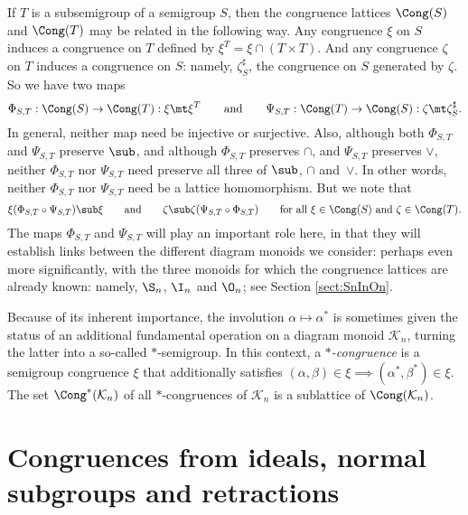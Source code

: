 If $T$ is a subsemigroup of a semigroup $S$, then the congruence lattices $\Cong(S)$ and $\Cong(T)$ may be related in the following way.  Any congruence $\xi$ on $S$ induces a congruence on $T$ defined by $\xi^T=\xi\cap(T\times T)$.  And any congruence $\zeta$ on $T$ induces a congruence on $S$: namely, $\zeta_S^\sharp$, the congruence on $S$ generated by $\zeta$.  So we have two maps
\[
\Phi_{S,T}:\Cong(S)\to\Cong(T):\xi\mt\xi^T \qquad\text{and}\qquad \Psi_{S,T}:\Cong(T)\to\Cong(S):\zeta\mt\zeta_S^\sharp.
\]
In general, neither map need be injective or surjective.  Also, although both $\Phi_{S,T}$ and $\Psi_{S,T}$ preserve $\sub$, and although $\Phi_{S,T}$ preserves $\cap$, and $\Psi_{S,T}$ preserves $\vee$, neither $\Phi_{S,T}$ nor $\Psi_{S,T}$ need preserve all three of $\sub$, $\cap$ and~$\vee$.  In other words, neither $\Phi_{S,T}$ nor $\Psi_{S,T}$ need be a lattice homomorphism.  But we note that
\[
\xi(\Phi_{S,T}\circ\Psi_{S,T}) \sub \xi \qquad\text{and}\qquad \zeta\sub\zeta(\Psi_{S,T}\circ\Phi_{S,T}) \qquad\text{for all $\xi\in\Cong(S)$ and $\zeta\in\Cong(T)$.}
\]
The maps $\Phi_{S,T}$ and $\Psi_{S,T}$ will play an important role here,
in that they will establish links between the different diagram monoids we consider:
perhaps even more significantly, with the three monoids for which the
congruence lattices are already known: namely, $\S_n$, $\I_n$ and $\O_n$; see
Section \ref{sect:SnInOn}.

Because of its inherent importance, the involution $\alpha\mapsto\alpha^\ast$
is sometimes given the status of an additional fundamental operation on a
diagram monoid $\mathcal{K}_n$, turning the latter into a so-called
$\ast$-semigroup.  In this context, a \emph{$\ast$-congruence} is a semigroup
congruence $\xi$ that additionally satisfies $(\alpha,\beta)\in\xi\implies(\alpha^\ast,\beta^\ast)\in\xi$.  The set $\Cong^*(\mathcal{K}_n)$ of all
$*$-congruences of $\mathcal K_n$ is a sublattice of $\Cong(\mathcal{K}_n)$.






\section{Congruences from ideals, normal subgroups and retractions}\label{sec-fam}



